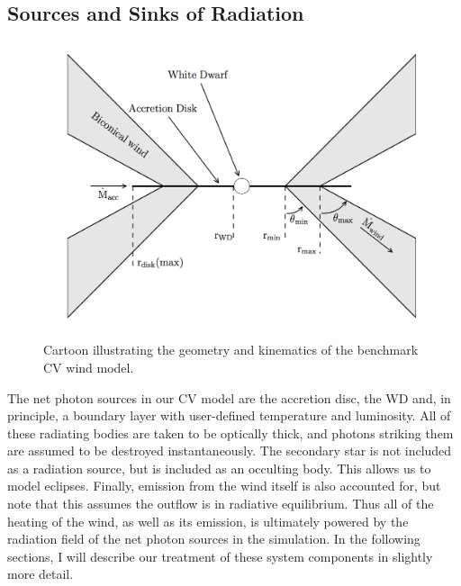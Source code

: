 

\subsection{Sources and Sinks of Radiation}
\label{radsources}

\begin{figure} 
\centering
\includegraphics[width=1.0\textwidth]{figures/05-cvpaper/fig2_cartoon.png}
\caption{Cartoon illustrating the geometry and kinematics of the benchmark CV wind model.}
\label{cartoon}
\end{figure} 

The net photon sources in our CV model are the accretion disc, the
WD and, in principle, a boundary layer with user-defined temperature
and luminosity. All of these radiating bodies are taken to be
optically thick, and photons striking them are assumed to be destroyed
instantaneously. The secondary star is not included as a radiation
source, but is included as an occulting body. This allows us to model
eclipses. Finally, emission from the wind itself is also accounted for, but
note that this assumes the outflow is in radiative equilibrium. Thus all
of the heating of the wind, as well as its emission, is ultimately
powered by the radiation field of the net photon sources in the
simulation. In the following sections, I will describe our treatment
of these system components in slightly more detail.

